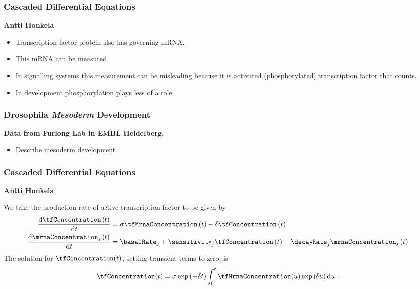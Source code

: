 \begin{frame}
  \frametitle{Cascaded Differential Equations}

  \begin{flushright}
    \textbf{Antti Honkela}
  \end{flushright}
  \begin{itemize}
  \item Transcription factor protein also has governing mRNA.
  \item This mRNA can be measured.
  \item In signalling systems this measurement can be misleading because it
    is activated (phosphorylated) transcription factor that counts.
  \item In development phosphorylation plays less of a role.
  \end{itemize}

\end{frame}

\begin{frame}
  \frametitle{Drosophila \emph{Mesoderm} Development}

  \textbf{Data from Furlong Lab in EMBL Heidelberg.}
  \begin{itemize}
  \item Describe mesoderm development.
  \end{itemize}

\end{frame}

\begin{frame}
  \frametitle{Cascaded Differential Equations }

  \begin{flushright}
    \textbf{Antti Honkela}
    \par\end{flushright}

  We take the production rate of active transcription factor to be given
  by \begin{align*}
    \frac{\text{d}\tfConcentration\left(t\right)}{\text{d}t} & =\sigma \tfMrnaConcentration\left(t\right)-\delta \tfConcentration\left(t\right)\\
    \frac{\text{d}\mrnaConcentration_{j}\left(t\right)}{\text{d}t} & =\basalRate_{j}+\sensitivity_{j}\tfConcentration\left(t\right)-\decayRate_{j}\mrnaConcentration_{j}\left(t\right)\end{align*}
  The solution for $\tfConcentration(t)$, setting transient terms to zero, is \[
  \tfConcentration(t)=\sigma\exp\left(-\delta t\right)\int_{0}^{t}\tfMrnaConcentration(u)\exp\left(\delta u\right)\text{d}u\ .\]



\end{frame}

